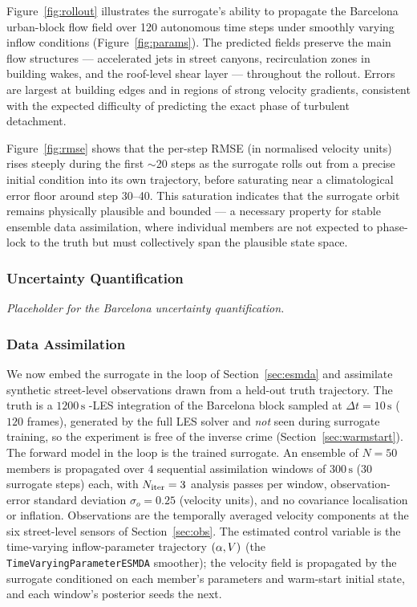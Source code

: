 Figure~\ref{fig:rollout} illustrates the surrogate's ability to propagate
the Barcelona urban-block flow field over 120 autonomous time steps under
smoothly varying inflow conditions (Figure~\ref{fig:params}).
The predicted fields preserve the main flow structures — accelerated jets
in street canyons, recirculation zones in building wakes, and the
roof-level shear layer — throughout the rollout. Errors are largest at
building edges and in regions of strong velocity gradients, consistent
with the expected difficulty of predicting the exact phase of turbulent
detachment.

Figure~\ref{fig:rmse} shows that the per-step RMSE (in normalised velocity
units) rises steeply during the first $\sim$20 steps as the surrogate
rolls out from a precise initial condition into its own trajectory, before
saturating near a climatological error floor around step 30--40. This
saturation indicates that the surrogate orbit remains physically plausible
and bounded — a necessary property for stable ensemble data assimilation,
where individual members are not expected to phase-lock to the truth but
must collectively span the plausible state space.

\subsubsection{Uncertainty Quantification}
\label{sec:bcn_uq}

\textit{Placeholder for the Barcelona uncertainty quantification.}

\subsubsection{Data Assimilation}
\label{sec:da_results}

We now embed the surrogate in the \esmda{} loop of Section~\ref{sec:esmda} and
assimilate synthetic street-level observations drawn from a held-out \palm{} truth
trajectory. The truth is a $1200\,\mathrm{s}$ \palm{}-LES integration of the
Barcelona block sampled at $\Delta t = 10\,\mathrm{s}$ ($120$ frames), generated
by the full LES solver and \emph{not} seen during surrogate training, so the
experiment is free of the inverse crime (Section~\ref{sec:warmstart}). The
forward model in the loop is the trained \pthreeds{} surrogate. An ensemble of
$N = 50$ members is propagated over $4$ sequential assimilation windows of
$300\,\mathrm{s}$ ($30$ surrogate steps) each, with $N_{\mathrm{iter}} = 3$
\esmda{} analysis passes per window, observation-error standard deviation
$\sigma_o = 0.25$ (velocity units), and no covariance localisation or inflation.
Observations are the temporally averaged velocity components at the six
street-level sensors of Section~\ref{sec:obs}. The estimated control variable is
the time-varying inflow-parameter trajectory $(\alpha, V)$ (the
\texttt{TimeVaryingParameterESMDA} smoother); the velocity field is propagated by
the surrogate conditioned on each member's parameters and warm-start initial
state, and each window's posterior seeds the next.

